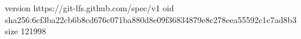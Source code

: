 version https://git-lfs.github.com/spec/v1
oid sha256:6cf3ba22cb6b8cd676c071ba880d8e09f36834879e8c278eea55592c1c7ad8b3
size 121998

